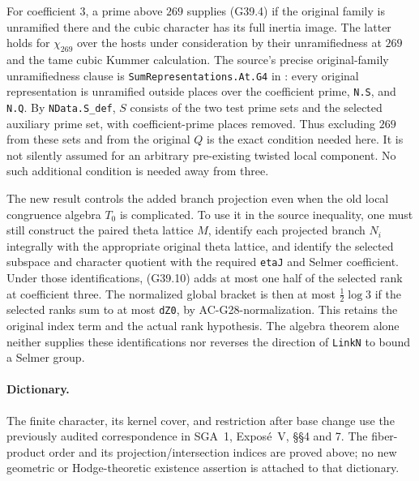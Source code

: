 For coefficient $3$, a prime above $269$ supplies (G39.4)
if the original family is unramified there and the cubic
character has its full inertia image.  The latter holds
for $\chi_{269}$ over the hosts under consideration by
their unramifiedness at $269$ and the tame cubic Kummer
calculation.  The source's precise original-family
unramifiedness clause is \texttt{SumRepresentations.At.G4}
in : every original
representation is unramified outside places over the
coefficient prime, \texttt{N.S}, and \texttt{N.Q}.
By \texttt{NData.S\_def}, $S$ consists of the two test
prime sets and the selected auxiliary prime set, with
coefficient-prime places removed.  Thus excluding $269$
from these sets and from the original $Q$ is the exact
condition needed here.  It is not silently assumed for
an arbitrary pre-existing twisted local component.
No such additional condition is needed away from three.

The new result controls the added branch projection even
when the old local congruence algebra $T_0$ is complicated.
To use it in the source inequality, one must still
construct the paired theta lattice $M$, identify each
projected branch $N_i$ integrally with the appropriate
original theta lattice, and identify the selected subspace
and character quotient with the required \texttt{etaJ}
and Selmer coefficient.  Under those identifications,
(G39.10) adds at most one half of the selected rank at
coefficient three.  The normalized global bracket is then
at most $\tfrac12\log3$ if the selected ranks sum to at
most \texttt{dZ0}, by AC-G28-normalization.  This retains
the original index term and the actual rank hypothesis.
The algebra theorem alone neither supplies these
identifications nor reverses the direction of
\texttt{LinkN} to bound a Selmer group.

\paragraph{Dictionary.}
The finite character, its kernel cover, and restriction
after base change use the previously audited correspondence
in SGA~1, Expos\'e~V, \S\S4 and 7.  The fiber-product order
and its projection/intersection indices are proved above;
no new geometric or Hodge-theoretic existence assertion
is attached to that dictionary.
